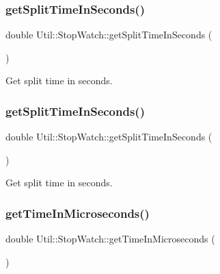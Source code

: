 \subsubsection{\texorpdfstring{getSplitTimeInSeconds()}{getSplitTimeInSeconds()}\hspace{0.1cm}{\footnotesize\ttfamily [1/2]}}
{\footnotesize\ttfamily double Util\+::\+Stop\+Watch\+::get\+Split\+Time\+In\+Seconds (\begin{DoxyParamCaption}{ }\end{DoxyParamCaption})}



Get split time in seconds. 

\mbox{\label{classUtil_1_1StopWatch_aa0934b52920e4075317c6176675efb95}} 
\subsubsection{\texorpdfstring{getSplitTimeInSeconds()}{getSplitTimeInSeconds()}\hspace{0.1cm}{\footnotesize\ttfamily [2/2]}}
{\footnotesize\ttfamily double Util\+::\+Stop\+Watch\+::get\+Split\+Time\+In\+Seconds (\begin{DoxyParamCaption}{ }\end{DoxyParamCaption})}



Get split time in seconds. 

\mbox{\label{classUtil_1_1StopWatch_ab4de18812edf2336f96c52afcb0386b6}} 
\subsubsection{\texorpdfstring{getTimeInMicroseconds()}{getTimeInMicroseconds()}\hspace{0.1cm}{\footnotesize\ttfamily [1/2]}}
{\footnotesize\ttfamily double Util\+::\+Stop\+Watch\+::get\+Time\+In\+Microseconds (\begin{DoxyParamCaption}{ }\end{DoxyParamCaption})}



